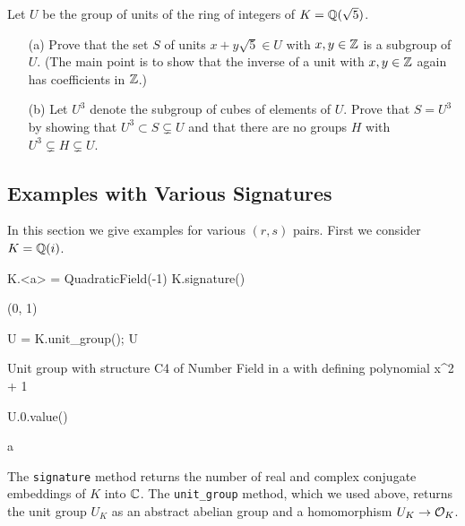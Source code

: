 \begin{exercise}
  Let $U$ be the group of units of the ring of integers
  of $K=\mathbb{Q}(\sqrt{5})$.
\begin{enumerate}
\item[(a)] Prove that the set $S$ of units $x+y\sqrt{5} \in U$ with
  $x,y\in\mathbb{Z}$ is a subgroup of $U$.  (The main point is to show that
  the inverse of a unit with $x,y\in\mathbb{Z}$ again has coefficients in
  $\mathbb{Z}$.)
\item[(b)] Let $U^3$ denote the subgroup of cubes of elements of $U$.
  Prove that $S=U^3$ by showing that $U^3\subset S \subsetneq U$ and
  that there are no groups $H$ with $U^3\subsetneq H \subsetneq U$.
\end{enumerate}
\end{exercise}

\subsection{Examples with Various Signatures}
In this section we give examples for various $(r,s)$ pairs.
First we consider $K=\mathbb{Q}(i)$.
\begin{sagecode}
\begin{sagecell}
K.<a> = QuadraticField(-1)
K.signature()
\end{sagecell}
\begin{sageout}
(0, 1)
\end{sageout}
\begin{sagecell}
U = K.unit_group(); U
\end{sagecell}
\begin{sageout}
Unit group with structure C4 of Number Field in a with
defining polynomial x^2 + 1
\end{sageout}
\begin{sagecell}
U.0.value()
\end{sagecell}
\begin{sageout}
a
\end{sageout}
\end{sagecode}

The {\tt signature} method returns the
number of real and complex conjugate embeddings
of $K$ into $\mathbb{C}$.  The \verb|unit_group| method,
which we used above, returns the unit group $U_K$
as an abstract abelian group and a homomorphism $U_K\to \mathcal{O}_K$.

